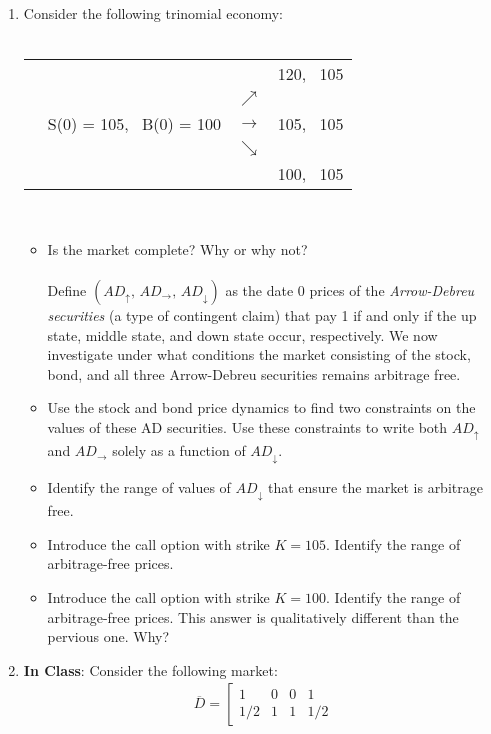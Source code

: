 \documentclass[12pt]{article}
\newcommand{\ol}{\overline}
\begin{document}
\begin{enumerate}
  \item Consider the following trinomial economy:
  \\
  \\
    \begin{tabular}{cccc}
    &   &   &  120, \,  105\\
    &   & $\nearrow$& \\
    \hspace*{20mm}&S(0) = 105, \, B(0) = 100 & $\rightarrow$ & 105, \, 105   \\
    &   & $\searrow$&     \\
    &   &   &  100, \,  105\\
    \end{tabular}\\
    \begin{itemize}
      \item Is the market complete? Why or why not?
      \\
      \\
      Define $(AD_{\uparrow}, \, AD_{\rightarrow}, \, AD_{\downarrow})$ as the date 0 prices of the \emph{Arrow-Debreu securities} (a type of contingent claim) that pay 1 if and only if the up state, middle state, and down state occur, respectively.  We now investigate under what conditions the market consisting of the stock, bond, and all three Arrow-Debreu securities remains arbitrage free. 
      \item Use the stock and bond price dynamics to find two constraints on the values of these AD securities.  Use these constraints to write both $AD_{\uparrow}$ and $AD_{\rightarrow}$ solely as a function of $AD_{\downarrow}$.
      \item Identify the range of values of $AD_{\downarrow}$ that ensure the market is arbitrage free.
      \item Introduce the call option with strike $K = 105$. Identify the range of arbitrage-free prices.
      \item Introduce the call option with strike $K = 100$. Identify the range of arbitrage-free prices.
This answer is qualitatively different than the pervious one. Why?
    \end{itemize}
  \item[] \textbf{In Class}: Consider the following market:
\begin{align*}
\ol{D}=
\left[\begin{array}{llll}
1 & 0 & 0 & 1\\
1/2 & 1 & 1 & 1/2
\end{array}

\end{align*}
\end{enumerate}
\end{document}

